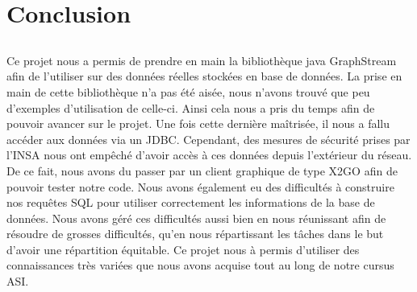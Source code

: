 \chapter{Conclusion}
\section*{}
Ce projet nous a permis de prendre en main la bibliothèque java GraphStream afin de l'utiliser sur des données réelles stockées en base de données.
La prise en main de cette bibliothèque n'a pas été aisée, nous n'avons trouvé que peu d'exemples d'utilisation de celle-ci. Ainsi cela nous a pris du temps afin de pouvoir avancer sur le projet.
Une fois cette dernière maîtrisée, il nous a fallu accéder aux données via un JDBC. Cependant, des mesures de sécurité prises par l'INSA nous ont empêché d'avoir accès à ces données depuis l'extérieur du réseau.
De ce fait, nous avons du passer par un client graphique de type X2GO afin de pouvoir tester notre code.
Nous avons également eu des difficultés à construire nos requêtes SQL pour utiliser correctement les informations de la base de données.
Nous avons géré ces difficultés aussi bien en nous réunissant afin de résoudre de grosses difficultés, qu'en nous répartissant les tâches dans le but d'avoir une répartition équitable.
Ce projet nous à permis d'utiliser des connaissances très variées que nous avons acquise tout au long de notre cursus ASI.
\section*{}
